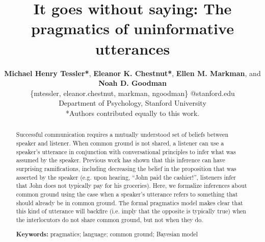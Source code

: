 \documentclass[10pt,letterpaper]{article}
\title{It goes without saying: The pragmatics of uninformative utterances}
\author{ {\large \bf Michael Henry Tessler*}, {\large \bf Eleanor K. Chestnut*},
{\large \bf Ellen M. Markman}, and {\large \bf Noah D. Goodman}  \\
\{mtessler, eleanor.chestnut, markman, ngoodman\} @stanford.edu \\ 
  Department of Psychology, Stanford University \\
  *Authors contributed equally to this work.}
\begin{document}
\maketitle


\begin{abstract}

Successful communication requires a mutually understood set of beliefs between speaker and listener.
When common ground is not shared, a listener can use a speaker's utterance in conjunction with conversational principles to infer what was assumed by the speaker.
Previous work has shown that this inference can have surprising ramifications, including decreasing the belief in the proposition that was asserted by the speaker 
(e.g. upon hearing, ``John paid the cashier!'', listeners infer that John does not typically pay for his groceries).
Here, we formalize inferences about common ground using the case when a speaker's utterance refers to something that should already be in common ground.
The formal pragmatics model makes clear that this kind of utterance will backfire (i.e. imply that the opposite is typically true) when the interlocutors do not share common ground, but not when they do.



\textbf{Keywords:} 
pragmatics; language; common ground; Bayesian model

\end{abstract}




\end{document}
